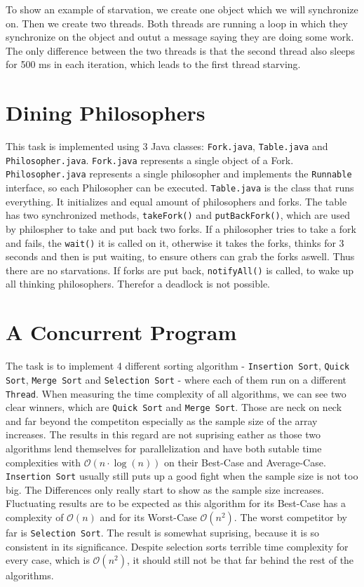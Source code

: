 \documentclass{article}
\begin{document}
  To show an example of starvation, we create one object which we will synchronize on. Then we create two threads. Both threads are running a loop in which they synchronize on the object and outut a message saying they are doing some work. The only difference between the two threads is that the second thread also sleeps for 500 ms in each iteration, which leads to the first thread starving.

  \section{Dining Philosophers}

  This task is implemented using 3 Java classes: \texttt{Fork.java}, \texttt{Table.java} and \texttt{Philosopher.java}. \texttt{Fork.java} represents a single object of a Fork. \texttt{Philosopher.java} represents a single philosopher and implements the \texttt{Runnable} interface, so each Philosopher can be executed. \texttt{Table.java} is the class that runs everything. It initializes and equal amount of philosophers and forks. The table has two synchronized methods, \texttt{takeFork()} and \texttt{putBackFork()}, which are used by philospher to take and put back two forks. If a philosopher tries to take a fork and fails, the \texttt{wait()} it is called on it, otherwise it takes the forks, thinks for 3 seconds and then is put waiting, to ensure others can grab the forks aswell. Thus there are no starvations. If forks are put back, \texttt{notifyAll()} is called, to wake up all thinking philosophers. Therefor a deadlock is not possible.

  \section{A Concurrent Program}

  The task is to implement 4 different sorting algorithm - \texttt{Insertion Sort}, \texttt{Quick Sort}, \texttt{Merge Sort} and \texttt{Selection Sort} - where each of them run on a different \texttt{Thread}. When measuring the time complexity of all algorithms, we can see two clear winners, which are \texttt{Quick Sort} and \texttt{Merge Sort}. Those are neck on neck and far beyond the competiton especially as the sample size of the array increases. The results in this regard are not suprising eather as those two algorithms lend themselves for parallelization and have both sutable time complexities with $\mathcal{O}(n\cdot \log(n))$ on their Best-Case and Average-Case. \texttt{Insertion Sort} usually still puts up a good fight when the sample size is not too big. The Differences only really start to show as the sample size increases. Fluctuating results are to be expected as this algorithm for its Best-Case has a complexity of $\mathcal{O}(n)$ and for its Worst-Case $\mathcal {O}(n^{2})$. The worst competitor by far is \texttt{Selection Sort}. The result is somewhat suprising, because it is so consistent in its significance. Despite selection sorts terrible time complexity for every case, which is $\mathcal {O}(n^{2})$, it should still not be that far behind the rest of the algorithms.
\end{document}

